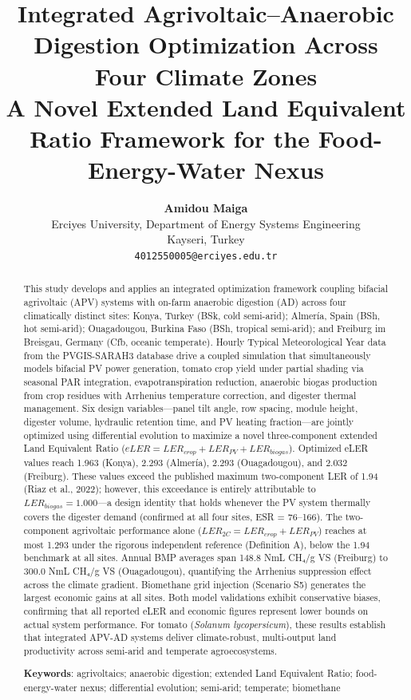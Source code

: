 \documentclass[12pt, a4paper]{article}
\title{\Large \textbf{Integrated Agrivoltaic--Anaerobic Digestion Optimization Across Four Climate Zones} \\
\vspace{0.5cm}
\large A Novel Extended Land Equivalent Ratio Framework for the Food-Energy-Water Nexus}
\author{\textbf{Amidou Maiga} \\
\small Erciyes University, Department of Energy Systems Engineering \\
\small Kayseri, Turkey \\
\small \texttt{4012550005@erciyes.edu.tr}}
\date{}
\begin{document}
\maketitle

\begin{abstract}
\noindent
{\scriptsize
This study develops and applies an integrated optimization framework coupling bifacial agrivoltaic (APV) systems with on-farm anaerobic digestion (AD) across four climatically distinct sites: Konya, Turkey (BSk, cold semi-arid); Almería, Spain (BSh, hot semi-arid); Ouagadougou, Burkina Faso (BSh, tropical semi-arid); and Freiburg im Breisgau, Germany (Cfb, oceanic temperate). Hourly Typical Meteorological Year data from the PVGIS-SARAH3 database drive a coupled simulation that simultaneously models bifacial PV power generation, tomato crop yield under partial shading via seasonal PAR integration, evapotranspiration reduction, anaerobic biogas production from crop residues with Arrhenius temperature correction, and digester thermal management. Six design variables—panel tilt angle, row spacing, module height, digester volume, hydraulic retention time, and PV heating fraction—are jointly optimized using differential evolution to maximize a novel three-component extended Land Equivalent Ratio ($eLER = LER_{crop} + LER_{PV} + LER_{biogas}$). Optimized eLER values reach 1.963 (Konya), 2.293 (Almería), 2.293 (Ouagadougou), and 2.032 (Freiburg). These values exceed the published maximum two-component LER of 1.94 (Riaz et al., 2022); however, this exceedance is entirely attributable to $LER_{biogas} = 1.000$—a design identity that holds whenever the PV system thermally covers the digester demand (confirmed at all four sites, ESR = 76–166). The two-component agrivoltaic performance alone ($LER_{2C} = LER_{crop} + LER_{PV}$) reaches at most 1.293 under the rigorous independent reference (Definition A), below the 1.94 benchmark at all sites. Annual BMP averages span 148.8 NmL CH₄/g VS (Freiburg) to 300.0 NmL CH₄/g VS (Ouagadougou), quantifying the Arrhenius suppression effect across the climate gradient. Biomethane grid injection (Scenario S5) generates the largest economic gains at all sites. Both model validations exhibit conservative biases, confirming that all reported eLER and economic figures represent lower bounds on actual system performance. For tomato (\textit{Solanum lycopersicum}), these results establish that integrated APV-AD systems deliver climate-robust, multi-output land productivity across semi-arid and temperate agroecosystems.

\vspace{0.5cm}
\noindent \textbf{Keywords}: agrivoltaics; anaerobic digestion; extended Land Equivalent Ratio; food-energy-water nexus; differential evolution; semi-arid; temperate; biomethane
}
\end{abstract}
\newpage
\end{document}
